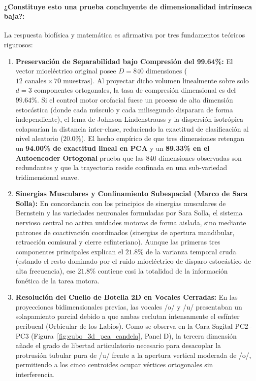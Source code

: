 \documentclass[11pt,a4paper]{article}
\begin{document}
\paragraph{¿Constituye esto una prueba concluyente de dimensionalidad intrínseca baja?:}
La respuesta biofísica y matemática es afirmativa por tres fundamentos teóricos rigurosos:
\begin{enumerate}
    \item \textbf{Preservación de Separabilidad bajo Compresión del 99.64\%:}
    El vector mioeléctrico original posee $D = 840$ dimensiones ($12 \text{ canales} \times 70 \text{ muestras}$). Al proyectar dicho volumen linealmente sobre solo $d = 3$ componentes ortogonales, la tasa de compresión dimensional es del $99.64\%$. Si el control motor orofacial fuese un proceso de alta dimensión estocástica (donde cada músculo y cada milisegundo disparara de forma independiente), el lema de Johnson-Lindenstrauss y la dispersión isotrópica colapsarían la distancia inter-clase, reduciendo la exactitud de clasificación al nivel aleatorio ($20.0\%$). El hecho empírico de que tres dimensiones retengan un \textbf{94.00\% de exactitud lineal en PCA} y un \textbf{89.33\% en el Autoencoder Ortogonal} prueba que las 840 dimensiones observadas son redundantes y que la trayectoria reside confinada en una sub-variedad tridimensional suave.
    \item \textbf{Sinergias Musculares y Confinamiento Subespacial (Marco de Sara Solla):}
    En concordancia con los principios de sinergias musculares de Bernstein y las variedades neuronales formuladas por Sara Solla, el sistema nervioso central no activa unidades motoras de forma aislada, sino mediante patrones de coactivación coordinados (sinergias de apertura mandibular, retracción comisural y cierre esfinteriano). Aunque las primeras tres componentes principales explican el $21.8\%$ de la varianza temporal cruda (estando el resto dominado por el ruido mioeléctrico de disparo estocástico de alta frecuencia), ese $21.8\%$ contiene casi la totalidad de la información fonética de la tarea motora.
    \item \textbf{Resolución del Cuello de Botella 2D en Vocales Cerradas:}
    En las proyecciones bidimensionales previas, las vocales /o/ y /u/ presentaban un solapamiento parcial debido a que ambas reclutan intensamente el esfínter peribucal (Orbicular de los Labios). Como se observa en la Cara Sagital PC2--PC3 (Figura~\ref{fig:cubo_3d_pca_candela}, Panel D), la tercera dimensión añade el grado de libertad articulatorio necesario para desacoplar la protrusión tubular pura de /u/ frente a la apertura vertical moderada de /o/, permitiendo a los cinco centroides ocupar vértices ortogonales sin interferencia.
\end{enumerate}
\end{document}
